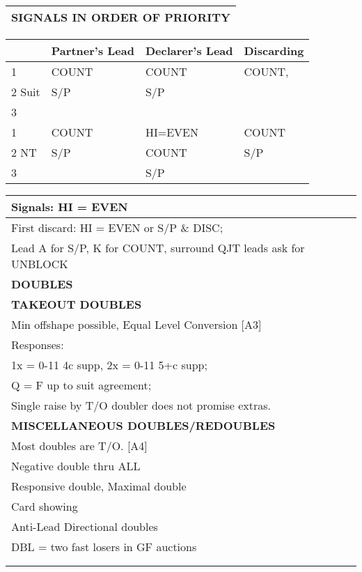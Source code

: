 \documentclass{article}
\begin{document}
\begin{minipage}{90mm}
\begin{tabular}{| p{88mm} |}
		\cellcolor{orange!25}\textbf{SIGNALS IN ORDER OF PRIORITY} \\ \hline
	\end{tabular}
	\begin{tabular}{| p{8.9mm} | p{22mm} | p{22mm} | p{22mm} |}
		& Partner's Lead & Declarer's Lead & Discarding \\ \hline
		1 & COUNT & COUNT & COUNT, \\ \hline
		2 Suit & S/P & S/P& \\ \hline
		3 & & & \\ \hline
		1 & COUNT & HI=EVEN & COUNT \\ \hline
		2 NT & S/P & COUNT & S/P \\ \hline
		3 & & S/P & \\ \hline
	\end{tabular}
	\begin{tabular}{| p{88mm} |}
		Signals: HI = EVEN\\ \hline
		First discard: HI = EVEN or S/P \& DISC;\\ \hline
		Lead A for S/P, K for COUNT, surround QJT leads ask for UNBLOCK\\ \hline \hline
		\cellcolor{green!25} \textbf{DOUBLES} \\ \hline
		\cellcolor{orange!25}\textbf{TAKEOUT DOUBLES} \\ \hline
		Min offshape possible, Equal Level Conversion [A3]\\ \hline
		Responses:\\ \hline
		1x = 0-11 4c supp, 2x = 0-11 5+c supp;\\ \hline
		Q = F up to suit agreement;\\ \hline
		Single raise by T/O doubler does not promise extras.\\ \hline
		\cellcolor{orange!25}\textbf{MISCELLANEOUS DOUBLES/REDOUBLES} \\ \hline
		Most doubles are T/O. [A4]\\ \hline
		Negative double thru ALL\\ \hline
		Responsive double, Maximal double\\ \hline
		Card showing\\ \hline
		Anti-Lead Directional doubles\\ \hline
		DBL = two fast losers in GF auctions\\ \hline
		\\ \hline
		\\ \hline
	\end{tabular}
\end{minipage}
\end{document}
